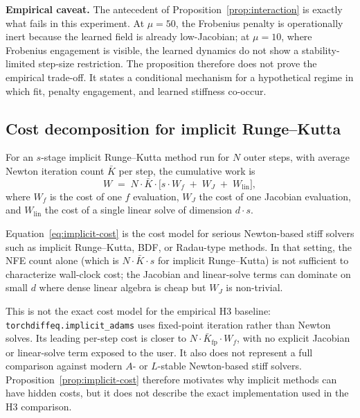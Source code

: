 \textbf{Empirical caveat.} The antecedent of
Proposition~\ref{prop:interaction} is exactly what fails in this experiment.
At $\mu=50$, the Frobenius penalty is operationally inert because the learned
field is already low-Jacobian; at $\mu=10$, where Frobenius engagement is
visible, the learned dynamics do not show a stability-limited step-size
restriction. The proposition therefore does not prove the empirical trade-off.
It states a conditional mechanism for a hypothetical regime in which fit,
penalty engagement, and learned stiffness co-occur.

\subsection{Cost decomposition for implicit Runge--Kutta}
\label{app:implicit-cost}

\begin{proposition}
\label{prop:implicit-cost}
For an $s$-stage implicit Runge--Kutta method run for $N$ outer steps, with average
Newton iteration count $\bar K$ per step, the cumulative work is
\begin{equation}
W \;=\; N \cdot \bar K \cdot \bigl[s \cdot W_f \;+\; W_J \;+\; W_\text{lin}\bigr],
\label{eq:implicit-cost}
\end{equation}
where $W_f$ is the cost of one $f$ evaluation, $W_J$ the cost of one Jacobian
evaluation, and $W_\text{lin}$ the cost of a single linear solve of dimension
$d \cdot s$.
\end{proposition}

Equation~\eqref{eq:implicit-cost} is the cost model for serious Newton-based
stiff solvers such as implicit Runge--Kutta, BDF, or Radau-type methods. In
that setting, the NFE count alone (which is $N \cdot \bar K \cdot s$ for
implicit Runge--Kutta) is not sufficient to characterize wall-clock cost; the
Jacobian and linear-solve terms can dominate on small $d$ where dense linear
algebra is cheap but $W_J$ is non-trivial.

This is not the exact cost model for the empirical H3 baseline:
\texttt{torchdiffeq.implicit\_adams} uses fixed-point iteration rather than
Newton solves. Its leading per-step cost is closer to
$N \cdot \bar K_\mathrm{fp} \cdot W_f$, with no explicit Jacobian or linear-solve
term exposed to the user. It also does not represent a full comparison against
modern $A$- or $L$-stable Newton-based stiff solvers. Proposition~\ref{prop:implicit-cost}
therefore motivates why implicit methods can have hidden costs, but it does
not describe the exact implementation used in the H3 comparison.

